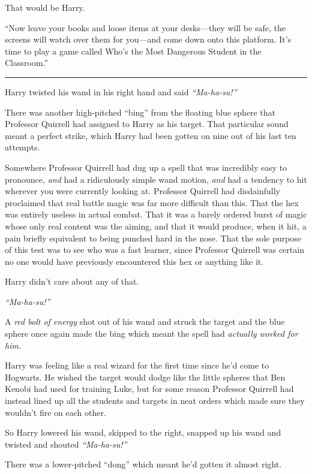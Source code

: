 That would be Harry.

``Now leave your books and loose items at your desks---they will be
safe, the screens will watch over them for you---and come down onto this
platform. It's time to play a game called Who's the Most Dangerous
Student in the Classroom.''

\begin{center}\rule{3in}{0.4pt}\end{center}

Harry twisted his wand in his right hand and said \emph{``Ma-ha-su!''}

There was another high-pitched ``bing'' from the floating blue sphere
that Professor Quirrell had assigned to Harry as his target. That
particular sound meant a perfect strike, which Harry had been gotten on
nine out of his last ten attempts.

Somewhere Professor Quirrell had dug up a spell that was incredibly easy
to pronounce, \emph{and} had a ridiculously simple wand motion,
\emph{and} had a tendency to hit wherever you were currently looking at.
Professor Quirrell had disdainfully proclaimed that real battle magic
was far more difficult than this. That the hex was entirely useless in
actual combat. That it was a barely ordered burst of magic whose only
real content was the aiming, and that it would produce, when it hit, a
pain briefly equivalent to being punched hard in the nose. That the sole
purpose of this test was to see who was a fast learner, since Professor
Quirrell was certain no one would have previously encountered this hex
or anything like it.

Harry didn't care about any of that.

\emph{``Ma-ha-su!''}

A \emph{red bolt of energy} shot out of his wand and struck the target
and the blue sphere once again made the bing which meant the spell had
\emph{actually worked for him.}

Harry was feeling like a real wizard for the first time since he'd come
to Hogwarts. He wished the target would dodge like the little spheres
that Ben Kenobi had used for training Luke, but for some reason
Professor Quirrell had instead lined up all the students and targets in
neat orders which made sure they wouldn't fire on each other.

So Harry lowered his wand, skipped to the right, snapped up his wand and
twisted and shouted \emph{``Ma-ha-su!''}

There was a lower-pitched ``dong'' which meant he'd gotten it almost
right.

